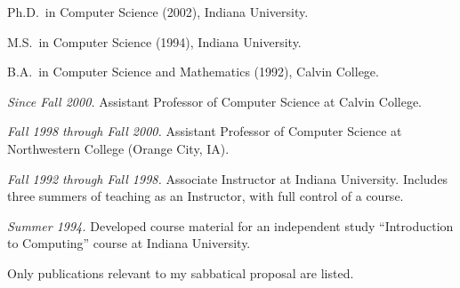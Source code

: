 \documentclass[ComputerScience]{vita}
\newcommand{\duphref}[1]{\href{#1}{#1}}
\begin{document}
\begin{vita}



\begin{Degrees}
\item Ph.D.\ in Computer Science (2002), Indiana University.
\item M.S.\ in Computer Science (1994), Indiana University.
\item B.A.\ in Computer Science and Mathematics (1992), Calvin College.
\end{Degrees}




\begin{Experience}

\item \emph{Since Fall 2000.}  Assistant Professor of Computer
  Science at Calvin College.  %

\item \emph{Fall 1998 through Fall 2000.}  Assistant Professor of
  Computer Science at Northwestern College (Orange City, IA).  %

\item \emph{Fall 1992 through Fall 1998.}  Associate Instructor at
  Indiana University.  Includes three summers of teaching as an
  Instructor, with full control of a course.

\item \emph{Summer 1994.}  Developed course material for an
  independent study ``Introduction to Computing'' course at Indiana
  University.

\end{Experience}


\begin{Publications}

  \item Only publications relevant to my sabbatical proposal are listed.


  \begin{Papers at Refereed Conferences}
	

\end{Papers at Refereed Conferences}
\end{Publications}
\end{vita}
\end{document}
